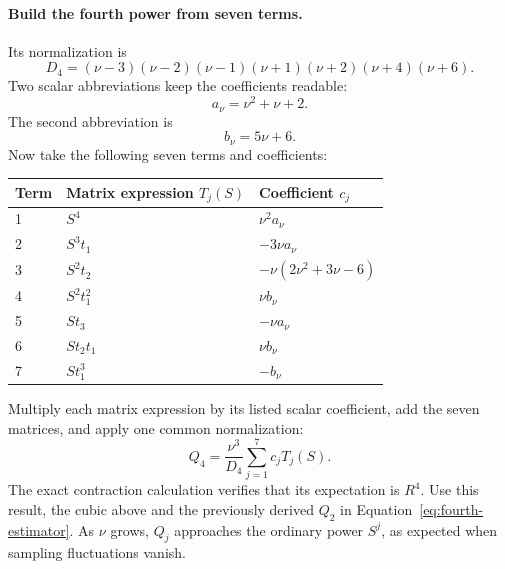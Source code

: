 \documentclass[11pt]{article}
\begin{document}
\paragraph{Build the fourth power from seven terms.}
Its normalization is
\begin{equation}
 D_4=(\nu-3)(\nu-2)(\nu-1)(\nu+1)(\nu+2)(\nu+4)(\nu+6).
\end{equation}
Two scalar abbreviations keep the coefficients readable:
\begin{equation}
 a_\nu=\nu^2+\nu+2.
\end{equation}
The second abbreviation is
\begin{equation}
 b_\nu=5\nu+6.
\end{equation}
Now take the following seven terms and coefficients:
\begin{center}
\begin{tabular}{lll}
\toprule
Term & Matrix expression $T_j(S)$ & Coefficient $c_j$\\
\midrule
1 & $S^4$ & $\nu^2a_\nu$\\
2 & $S^3t_1$ & $-3\nu a_\nu$\\
3 & $S^2t_2$ & $-\nu(2\nu^2+3\nu-6)$\\
4 & $S^2t_1^2$ & $\nu b_\nu$\\
5 & $S t_3$ & $-\nu a_\nu$\\
6 & $S t_2t_1$ & $\nu b_\nu$\\
7 & $S t_1^3$ & $-b_\nu$\\
\bottomrule
\end{tabular}
\end{center}
Multiply each matrix expression by its listed scalar coefficient, add the
seven matrices, and apply one common normalization:
\begin{equation}
 Q_4=\frac{\nu^3}{D_4}\sum_{j=1}^{7}c_jT_j(S).
 \label{eq:unbiased-fourth}
\end{equation}
The exact contraction calculation verifies that its expectation is $R^4$.
Use this result, the cubic above and the previously derived $Q_2$ in
Equation~\eqref{eq:fourth-estimator}. As $\nu$ grows, $Q_j$ approaches the
ordinary power $S^j$, as expected when sampling fluctuations vanish.
\end{document}
